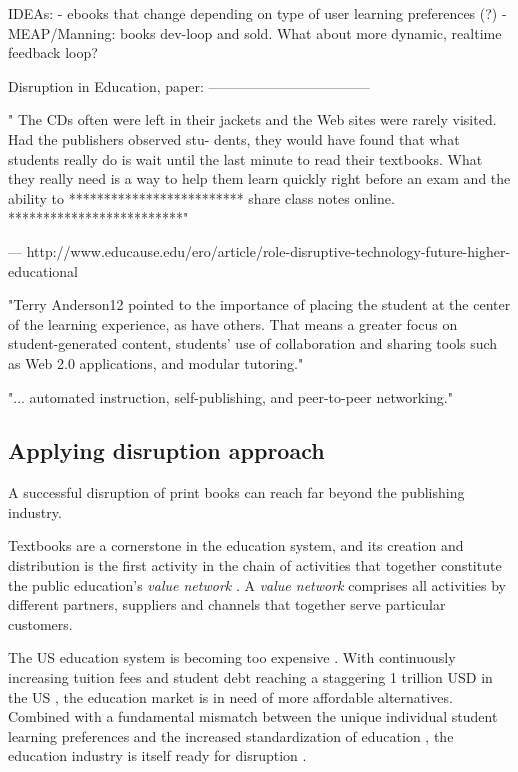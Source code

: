 \documentclass[a4paper,10pt]{article}
\begin{document}
 IDEAs: 
 - ebooks that change depending on type of user learning preferences (?)
 - MEAP/Manning: books dev-loop and sold. What about more dynamic, realtime feedback loop?
 
 
 Disruption in Education, paper:
-----------------------------------

" The CDs often were left in their jackets and the
Web sites were rarely visited. Had the publishers observed stu-
dents, they would have found that what students really do is
wait until the last minute to read their textbooks. What they
really need is a way to help them learn quickly right before an
exam and the ability to 
*************************
share class notes online.
*************************"


---
http://www.educause.edu/ero/article/role-disruptive-technology-future-higher-educational

"Terry Anderson12 pointed to the importance of placing the student at the center of the learning experience, as have others.
 That means a greater focus on student-generated content, students’ use of collaboration and sharing tools such as Web 2.0 applications, and modular tutoring."

"... automated instruction, self-publishing, and peer-to-peer networking."

\subsection{Applying disruption approach}
A successful disruption of print books can reach far beyond the publishing industry.

Textbooks are a cornerstone in the education system, and its creation and distribution is the first activity in 
the chain of activities that together constitute the public education's 
\emph{value network} \cite{DisruptingClassExpandedEdition}. A \emph{value network} comprises all activities by different partners, 
suppliers and channels that together serve particular customers.

The US education system is becoming too expensive \cite{theInnovativeUniversity}. 
With continuously increasing tuition fees \cite{risingTuitionFees}\cite{theInnovativeUniversity} and student debt 
reaching a staggering 1 trillion USD in the US \cite{oneTrillionUsStudentDebt}, the education market is in need of 
more affordable alternatives. Combined with a fundamental mismatch between the unique individual student learning 
preferences and the increased standardization of education \cite{DisruptingClassExpandedEdition}\cite{educationInnovationNecessaryForEconomicGrowth}, 
the education industry is itself ready for disruption \cite{DisruptingClassExpandedEdition}\cite{theInnovativeUniversity}.
\end{document}
